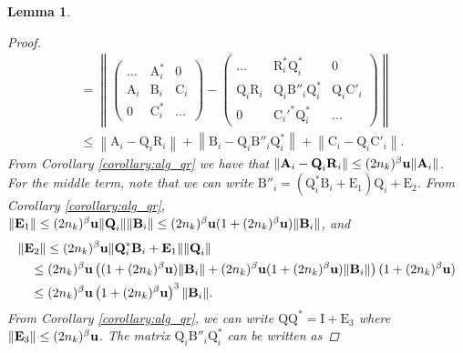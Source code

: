 \documentclass{article}
\newcommand{\lnorm}{\left\|}
\newcommand{\rnorm}{\right\|}
\newcommand{\lpar}{\left(}
\newcommand{\rpar}{\right)}
\newtheorem{lemma}{Lemma}[section]
\newcommand\matA{\boldsymbol{\mathrm{A}}}
\newcommand\matB{\boldsymbol{\mathrm{B}}}
\newcommand\matC{\boldsymbol{\mathrm{C}}}
\newcommand\matE{\boldsymbol{\mathrm{E}}}
\newcommand\matI{\boldsymbol{\mathrm{I}}}
\newcommand\matQ{\boldsymbol{\mathrm{Q}}}
\newcommand\matR{\boldsymbol{\mathrm{R}}}
\newcommand{\umach}{\textbf{\textup{u}}}
\newcommand{\cmm}{\beta}
\begin{document}
\begin{lemma}
\begin{proof}
\begin{align}
            &=
            \lnorm
                \begin{pmatrix}
                    \ldots            &\matA_i^*        & 0       \\
                    \matA_{i}         & \matB_{i}       & \matC_i \\
                    0                 & \matC_{i}^*     & \ldots
                \end{pmatrix}
                -
                \begin{pmatrix}
                \ldots            &\matR_i^*\matQ_i^*        & 0       \\
                \matQ_i\matR_{i}         & \matQ_i\matB''_{i}\matQ_i^*     & \matQ_i\matC'_i \\
                0                 & \matC_{i}'^*\matQ_i^*    & \ldots
                \end{pmatrix}
            \rnorm
            \nonumber
            \\
            &\leq
            \lnorm
                \matA_i-\matQ_i\matR_i
            \rnorm
            +
            \lnorm
                \matB_i-\matQ_i\matB''_i\matQ_i^*
            \rnorm
            +
            \lnorm
                \matC_i-\matQ_i\matC'_i
            \rnorm.
        \end{align}
        From Corollary \ref{corollary:alg_qr} we have that $\|\matA_i-\matQ_i\matR_i\| \leq (2n_k)^{\cmm}\umach\|\matA_i\|$.
        For the middle term, note that we can write $\matB''_i=(\matQ_i^*\matB_i+\matE_1)\matQ_i+\matE_2$. From Corollary \ref{corollary:alg_qr}, $\|\matE_1\|\leq (2n_k)^{\cmm}\umach\|\matQ_i\|\|\matB_i\| 
        \leq (2n_k)^{\cmm}\umach (1+(2n_k)^{\cmm}\umach) \|\matB_i\|
        $, and
        \begin{align*}
            &\|\matE_2\| \leq (2n_k)^{\cmm}\umach \|\matQ_i^*\matB_i+\matE_1\|\|\matQ_i\| 
            \\
            &\quad\leq 
            (2n_k)^{\cmm}\umach
            \lpar
                (1+(2n_k)^{\cmm}\umach)\|\matB_i\|+(2n_k)^{\cmm}\umach (1+(2n_k)^{\cmm}\umach) \|\matB_i\|
            \rpar
            (1+(2n_k)^{\cmm}\umach)
            \\
            &\quad\leq 
            (2n_k)^{\cmm}\umach
            \lpar
                1+(2n_k)^{\cmm}\umach
            \rpar^3
            \|\matB_i\|.
        \end{align*}
        From Corollary \ref{corollary:alg_qr}, we can write $\matQ\matQ^*=\matI+\matE_3$ where $\|\matE_3\|\leq (2n_k)^{\cmm}\umach$. The matrix $\matQ_i\matB''_i\matQ_i^*$ can be written as

\end{proof}
\end{lemma}
\end{document}
